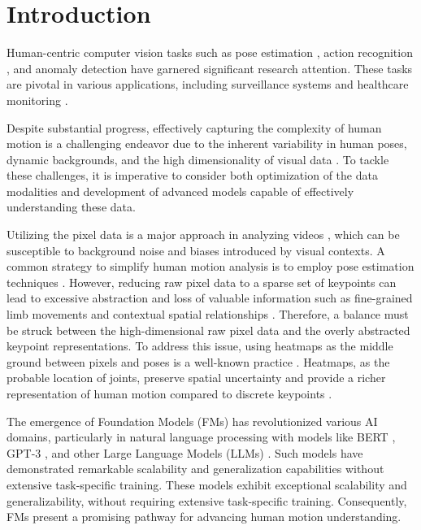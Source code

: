 \section{Introduction}
\label{sec:intro}

Human-centric computer vision tasks such as pose estimation \cite{sun2019deep, fang2022alphapose, cheng2020higherhrnet}, action recognition \cite{PoseConv3D, geng2023focusing, yang2024one}, and anomaly detection \cite{noghre2024exploratory, hirschorn2023normalizing, wang2023memory} have garnered significant research attention. These tasks are pivotal in various applications, including surveillance systems \cite{pazho2023ancilia, neff2019revamp, ardabili2023understanding} and healthcare monitoring \cite{eswaran2024artificial, khang2024application, luo2023computer}.

Despite substantial progress, effectively capturing the complexity of human motion is a challenging endeavor due to the inherent variability in human poses, dynamic backgrounds, and the high dimensionality of visual data \cite{xie2024dynamic, alinezhad2023understanding}. To tackle these challenges, it is imperative to consider both optimization of the data modalities and development of advanced models capable of effectively understanding these data.

Utilizing the pixel data is a major approach in analyzing videos \cite{wang2023memory, zaheer2022generative, rasheed2023fine}, which can be susceptible to background noise and biases introduced by visual contexts. A common strategy to simplify human motion analysis is to employ pose estimation techniques \cite{sun2019deep, fang2022alphapose, cheng2020higherhrnet}. However, reducing raw pixel data to a sparse set of keypoints can lead to excessive abstraction and loss of valuable information such as fine-grained limb movements and contextual spatial relationships \cite{kocabas2019self, PoseConv3D}. Therefore, a balance must be struck between the high-dimensional raw pixel data and the overly abstracted keypoint representations. To address this issue, using heatmaps as the middle ground between pixels and poses is a well-known practice \cite{feng2023diffpose, luo2021rethinking}. Heatmaps, as the probable location of joints, preserve spatial uncertainty and provide a richer representation of human motion compared to discrete keypoints \cite{PoseConv3D}.

The emergence of Foundation Models (FMs) \cite{wang2024sam, wang2023internimage, chen2024internvl, ma2023crepe} has revolutionized various AI domains, particularly in natural language processing with models like BERT \cite{kenton2019bert}, GPT-3 \cite{brown2020language}, and other Large Language Models (LLMs) \cite{deng2024k2, myers2024foundation}. Such models have demonstrated remarkable scalability and generalization capabilities without extensive task-specific training. These models exhibit exceptional scalability and generalizability, without requiring extensive task-specific training. Consequently, FMs present a promising pathway for advancing human motion understanding.

